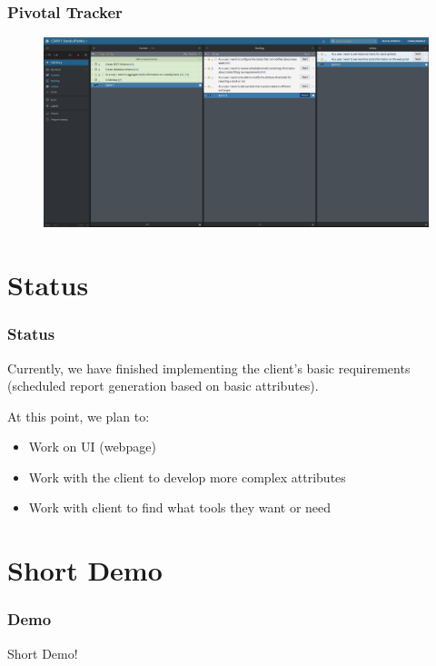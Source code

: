 \documentclass{beamer}
\begin{document}
\begin{frame}
\frametitle{Pivotal Tracker}
\begin{figure}[h!]
  \centering
  \includegraphics[scale=0.18]{PT.png}
\end{figure}
\end{frame}

\section{Status}
\begin{frame}
\frametitle{Status}
Currently, we have finished implementing the client's basic requirements (scheduled report generation based on basic attributes).
\vspace{0.3cm}

At this point, we plan to:
\begin{itemize}
\item Work on UI (webpage)
\item Work with the client to develop more complex attributes
\item Work with client to find what tools they want or need
\end{itemize}
\end{frame}

\section{Short Demo}
\begin{frame}
\frametitle{Demo}
Short Demo!
\end{frame}
\end{document}
